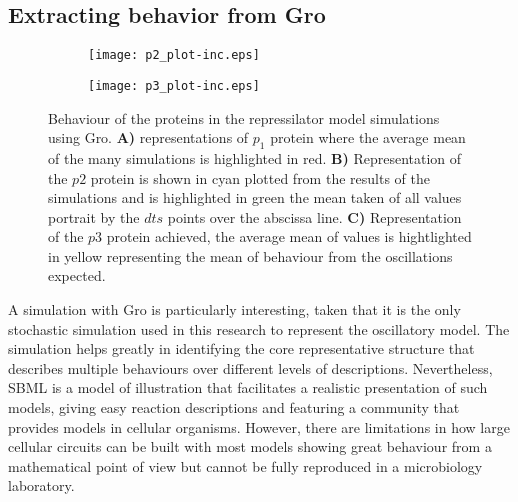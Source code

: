 \documentclass[12pt]{article}
\begin{document}
\subsection{Extracting behavior from Gro}

\begin{center}
    \begin{figure}[h]
        
        
        \begin{subfigure}{}
            \texttt{[image: p2\_plot-inc.eps]}
        \end{subfigure}
        \begin{subfigure}{}
            \texttt{[image: p3\_plot-inc.eps]}
        \end{subfigure}
        
        \caption{
        Behaviour of the proteins in the repressilator model simulations using Gro. \textbf{A)} representations of $p_{1}$ protein where the average mean of the many simulations is highlighted in red. \textbf{B)} Representation of the $p2$ protein is shown in cyan plotted from the results of the simulations and is highlighted in green the mean taken of all values portrait by the $dts$ points over the abscissa line. \textbf{C)} Representation of the $p3$ protein achieved, the average mean of values is hightlighted in yellow representing the mean of behaviour from the oscillations expected.}
    \end{figure}
\end{center}

A simulation with Gro is particularly interesting, taken that it is the only stochastic simulation used in this research to represent the oscillatory model. The simulation helps greatly in identifying the core representative structure that describes multiple behaviours over different levels of descriptions. Nevertheless, SBML is a model of illustration that facilitates a realistic presentation of such models, giving easy reaction descriptions and featuring a community that provides models in cellular organisms. However, there are limitations in how large cellular circuits can be built with most models showing great behaviour from a mathematical point of view but cannot be fully reproduced in a microbiology laboratory.
\end{document}
